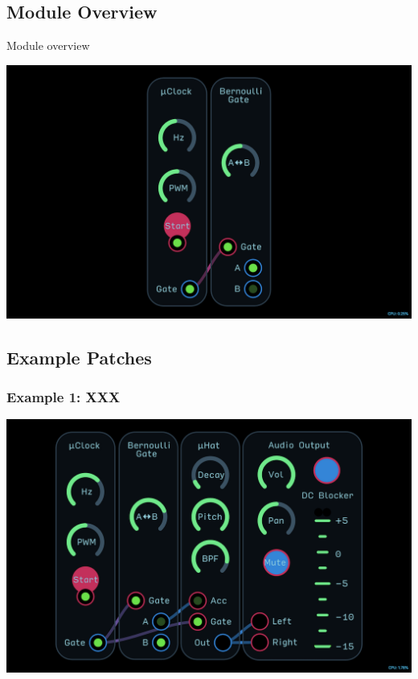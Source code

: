 \documentclass[11pt]{book}
\begin{document}
\begin{multicols*}{2}

\subsection*{Module Overview}

Module overview

\begin{center}
\includegraphics[width=0.95\linewidth]{bernoulli-gate-fig1.png}
\end{center}

\subsection*{Example Patches}

\subsubsection*{Example 1: XXX}

\begin{center}
\includegraphics[width=0.95\linewidth]{bernoulli-gate-fig4.png}
\end{center}


\end{multicols*}
\end{document}
